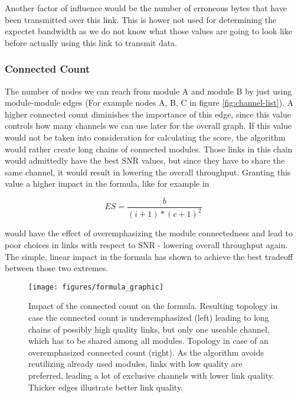 	Another factor of influence would be the number of erroneous bytes that have been transmitted over this link. 
	This is hower not used for determining the expectet bandwidth as we do not know what those values are going to 
	look like before actually using this link to transmit data.

      \subsubsection{Connected Count}
	The number of nodes we can reach from module A and module B by just using module-module edges (For example nodes A, B, C in figure \ref{fig:channel-list}). 
	A higher connected count diminishes the importance of this edge, since this value controls how many channels we can use later for the overall graph.
	If this value would not be taken into consideration for calculating the score, the algorithm would rather create long chains of connected modules. 
	Those links in this chain would admittedly have the best \ac{SNR} values, but since they have to share the same channel, 
	it would result in lowering the overall throughput. Granting this value a higher impact in the formula, like for example in 
	
	\begin{equation}
	  ES=\frac{b}{(i + 1)* (c + 1)^2}
	\end{equation}
	
	would have the effect of overemphasizing the module connectedness and lead to poor choices in links with respect to \ac{SNR} - 
	lowering overall throughput again. The simple, linear impact in the formula has shown to achieve the best tradeoff between those two extremes.
	
	\begin{figure}[h!]
	  \centering
	  \texttt{[image: figures/formula\_graphic]}
	  \caption{Impact of the connected count on the formula. Resulting topology in case the connected count is underemphasized (left) leading
	    to long chains of possibly high quality links, but only one useable channel, which has to be shared among all modules.
	    Topology in case of an overemphasized connected count (right). As the algorithm avoids reutilizing already used modules,
	    links with low quality are preferred, leading a lot of exclusive channels with lower link quality. Thicker edges illustrate better link quality.}
	  \label{fig:formula_graphic}
	\end{figure}

\newpage
	
